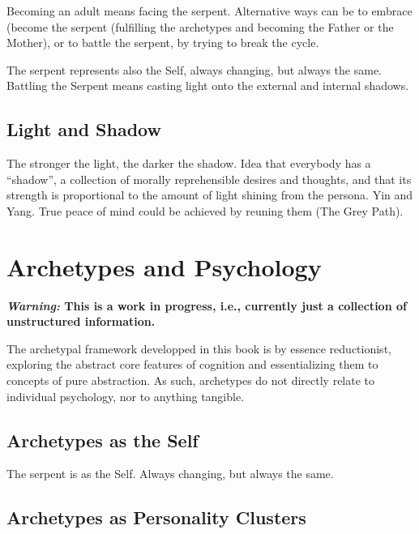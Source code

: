 \documentclass[
]{book}
\begin{document}
Becoming an adult means facing the serpent. Alternative ways can be to embrace (become the serpent (fulfilling the archetypes and becoming the Father or the Mother), or to battle the serpent, by trying to break the cycle.

The serpent represents also the Self, always changing, but always the same. Battling the Serpent means casting light onto the external and internal shadows.

\hypertarget{light-and-shadow}{%
\section{Light and Shadow}\label{light-and-shadow}}

The stronger the light, the darker the shadow.
Idea that everybody has a ``shadow'', a collection of morally reprehensible desires and thoughts, and that its strength is proportional to the amount of light shining from the persona. Yin and Yang. True peace of mind could be achieved by reuning them (The Grey Path).

\hypertarget{archetypes-and-psychology}{%
\chapter{Archetypes and Psychology}\label{archetypes-and-psychology}}

\textbf{\emph{Warning:} This is a work in progress, i.e., currently just a collection of unstructured information.}

The archetypal framework developped in this book is by essence reductionist, exploring the abstract core features of cognition and essentializing them to concepts of pure abstraction. As such, archetypes do not directly relate to individual psychology, nor to anything tangible.

\hypertarget{archetypes-as-the-self}{%
\section{Archetypes as the Self}\label{archetypes-as-the-self}}

The serpent is as the Self. Always changing, but always the same.

\hypertarget{archetypes-as-personality-clusters}{%
\section{Archetypes as Personality Clusters}\label{archetypes-as-personality-clusters}}
\end{document}
